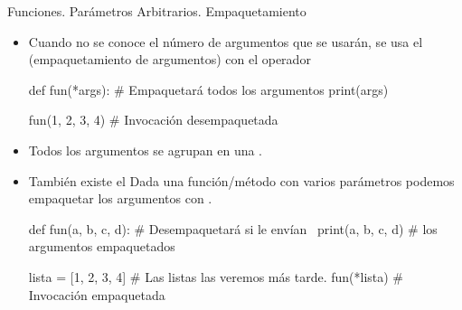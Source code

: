 \documentclass[10pt,envcountsect,spanish]{beamer}
\begin{document}
\begin{frame}[fragile]{Funciones. Parámetros Arbitrarios. Empaquetamiento}

\begin{itemize}\setlength{\itemsep}{0mm}

\item Cuando no se conoce el número de argumentos que se usarán, se usa el \\  (empaquetamiento de argumentos) con el operador  \cm{*}

{\small
\begin{pyconsole}[][frame=single]
def fun(*args):   # Empaquetará todos los argumentos
    print(args)

fun(1, 2, 3, 4)   # Invocación desempaquetada
\end{pyconsole}
}

\item Todos los argumentos se agrupan en una .

\item También existe el  Dada una función/método con varios parámetros podemos empaquetar los argumentos con \key{*}.

\small
\begin{pyconsole}[][frame=single]
def fun(a, b, c, d):   # Desempaquetará si le envían \
    print(a, b, c, d)  # los argumentos empaquetados

lista = [1, 2, 3, 4] # Las listas las veremos más tarde.
fun(*lista)          # Invocación empaquetada
\end{pyconsole}

\end{itemize}
\end{frame}
\end{document}
